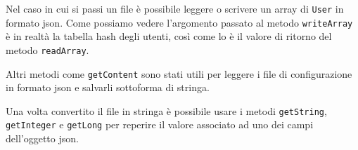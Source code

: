 Nel caso in cui si passi un file è possibile leggere o scrivere un array di \verb|User| in formato
json. Come possiamo vedere l'argomento passato al metodo \verb|writeArray| è in realtà la tabella
hash degli utenti, così come lo è il valore di ritorno del metodo \verb|readArray|.

Altri metodi come \verb|getContent| sono stati utili per leggere i file di configurazione in
formato json e salvarli sottoforma di stringa.

Una volta convertito il file in stringa è possibile usare i metodi \verb|getString|,
\verb|getInteger| e \verb|getLong| per reperire il valore associato ad uno dei campi dell'oggetto
json.